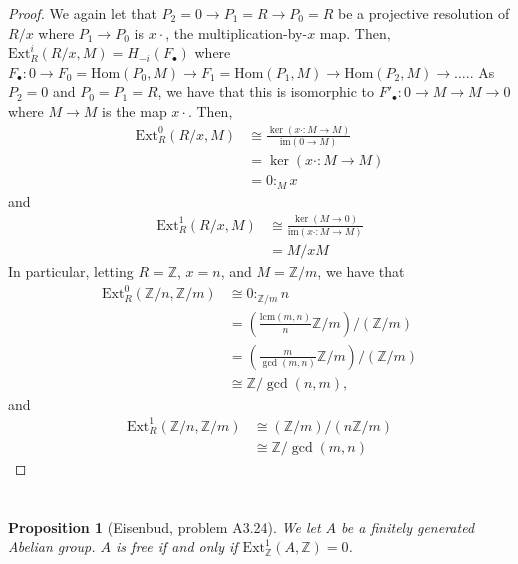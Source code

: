 \documentclass[english]{article}
\newcommand{\ZZ}{\mathbb{Z}}
\newcommand{\prob}[1]{\setcounter{section}{#1-1}\section{}}
\newtheorem*{prop*}{Proposition}
\theoremstyle{remark}
\theoremstyle{definition}
\newcommand{\lcm}{\mathrm{lcm}}
\renewcommand{\hom}{\mathrm{Hom}}
\newcommand{\im}{\mathrm{im}}
\newcommand{\ext}{\mathrm{Ext}}
\newcommand{\col}[3]{{#1}:_{#2}{#3}}
\begin{document}
\begin{proof}
	We again let that $P_2=0\to P_1=R\to P_0=R$ be a projective resolution of $R/x$ where $P_1\to P_0$ is $x\cdot$, the multiplication-by-$x$ map. Then, $\ext^i_R(R/x,M)=H_{-i}(F_\bullet)$ where $F_\bullet\colon0\to F_0=\hom(P_0,M)\to F_1=\hom(P_1,M)\to \hom(P_2,M)\to\hdots.$. As $P_2=0$ and $P_0=P_1=R$, we have that this is isomorphic to $F'_\bullet\colon0\to M\to M\to 0$ where $M\to M$ is the map $x\cdot$. Then, \begin{align*}\ext_R^0(R/x,M)&\cong\frac{\ker(x\cdot:M\to M)}{\im(0\to M)}\\&=\ker (x\cdot:M\to M)\\&= \col{0}{M}{x}\end{align*}
	and \begin{align*}
	\ext^1_R(R/x,M)&\cong \frac{\ker(M\to 0)}{\im(x\cdot:M\to M)}\\&=M/xM
	\end{align*}
	In particular, letting $R=\ZZ$, $x=n$, and $M=\ZZ/m$, we have that \begin{align*}
\ext_R^0(\ZZ/n,\ZZ/m)&\cong\col{0}{\ZZ/m}{n}\\&=\left(\frac{\lcm(m,n)}{n}\ZZ/m\right)/\left(\ZZ/m\right)\\&=\left(\frac{m}{\gcd(m,n)}\ZZ/m\right)/\left(\ZZ/m\right)\\&\cong \ZZ/\gcd(n,m),	\end{align*} and \begin{align*}
	\ext_R^1(\ZZ/n,\ZZ/m)&\cong (\ZZ/m)/\left(n\ZZ/m\right)\\&\cong \ZZ/\gcd(m,n)
\end{align*}
\end{proof}
%
%
%
\prob{34}\begin{prop*}[Eisenbud, problem A3.24]
	We let $A$ be a finitely generated Abelian group. $A$ is free if and only if $\ext_\ZZ^1(A,\ZZ)=0$.
\end{prop*}
\end{document}
